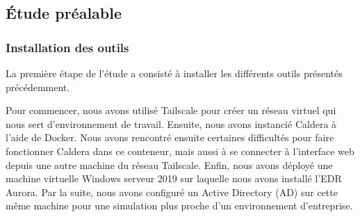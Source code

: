 \documentclass[12pt,letterpaper]{article}
\begin{document}
\subsection{Étude préalable}
\subsubsection{Installation des outils}

La première étape de l'étude a consisté à installer les différents outils présentés précédemment.

\bigskip

Pour commencer, nous avons utilisé Tailscale pour créer un réseau virtuel qui nous sert d'environnement de travail.
Ensuite, nous avons instancié Caldera à l'aide de Docker.
Nous avons rencontré ensuite certaines difficultés pour faire fonctionner Caldera dans ce conteneur, mais aussi à se connecter à l'interface web depuis une autre machine du réseau Tailscale.
Enfin, nous avons déployé une machine virtuelle Windows serveur 2019 sur laquelle nous avons installé l'EDR Aurora.
Par la suite, nous avons configuré un Active Directory (AD) sur cette même machine pour une simulation plus proche d'un environnement d'entreprise.
\end{document}
